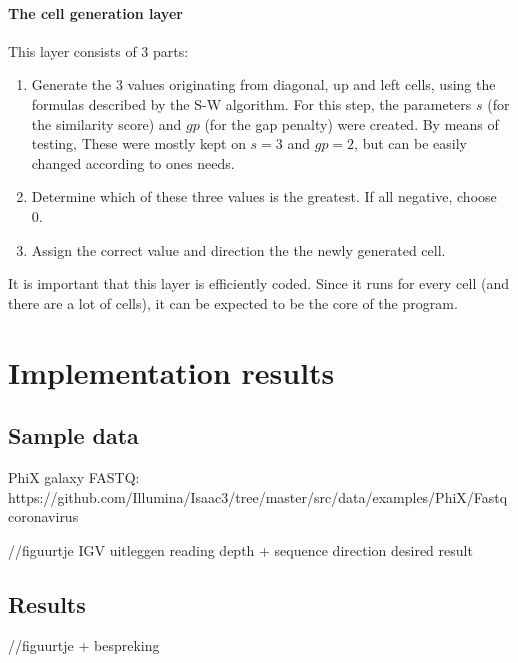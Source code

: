 \paragraph{The cell generation layer}
This layer consists of 3 parts:
\begin{enumerate}
	\item Generate the 3 values originating from diagonal, up and left cells, using the formulas described by the S-W algorithm. For this step, the parameters $s$ (for the similarity score) and $gp$ (for the gap penalty) were created. By means of testing, These were mostly kept on $s=3$ and $gp=2$, but can be easily changed according to ones needs.
	\item Determine which of these three values is the greatest. If all negative, choose 0.
	\item Assign the correct value and direction the the newly generated cell.
\end{enumerate}

It is important that this layer is efficiently coded. Since it runs for every cell (and there are a lot of cells), it can be expected to be the core of the program.

\section{Implementation results}

\subsection{Sample data}

PhiX 
galaxy
FASTQ: https://github.com/Illumina/Isaac3/tree/master/src/data/examples/PhiX/Fastq
coronavirus

//figuurtje IGV
uitleggen reading depth + sequence direction
desired result

\subsection{Results}

//figuurtje + bespreking
